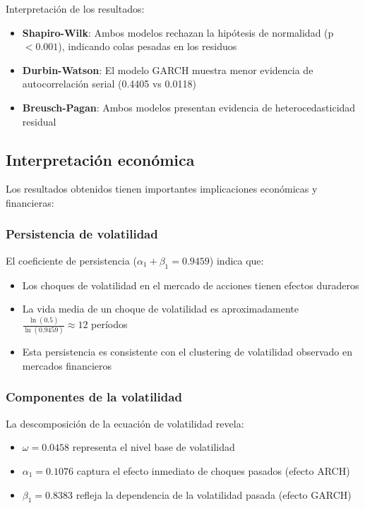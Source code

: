Interpretación de los resultados:

\begin{itemize}
    \item \textbf{Shapiro-Wilk}: Ambos modelos rechazan la hipótesis de normalidad (p $< 0.001$), indicando colas pesadas en los residuos
    \item \textbf{Durbin-Watson}: El modelo GARCH muestra menor evidencia de autocorrelación serial (0.4405 vs 0.0118)
    \item \textbf{Breusch-Pagan}: Ambos modelos presentan evidencia de heterocedasticidad residual
\end{itemize}

\subsection{Interpretación económica}

Los resultados obtenidos tienen importantes implicaciones económicas y financieras:

\subsubsection{Persistencia de volatilidad}

El coeficiente de persistencia ($\alpha_1 + \beta_1 = 0.9459$) indica que:
\begin{itemize}
    \item Los choques de volatilidad en el mercado de acciones tienen efectos duraderos
    \item La vida media de un choque de volatilidad es aproximadamente $\frac{\ln(0.5)}{\ln(0.9459)} \approx 12$ períodos
    \item Esta persistencia es consistente con el clustering de volatilidad observado en mercados financieros
\end{itemize}

\subsubsection{Componentes de la volatilidad}

La descomposición de la ecuación de volatilidad revela:
\begin{itemize}
    \item $\omega = 0.0458$ representa el nivel base de volatilidad
    \item $\alpha_1 = 0.1076$ captura el efecto inmediato de choques pasados (efecto ARCH)
    \item $\beta_1 = 0.8383$ refleja la dependencia de la volatilidad pasada (efecto GARCH)
\end{itemize}


